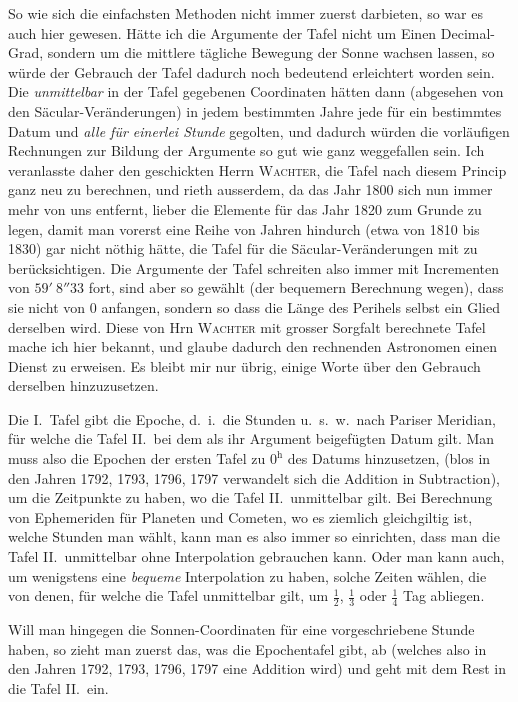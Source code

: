 So wie sich die einfachsten Methoden nicht immer zuerst darbieten, so war es auch hier gewesen. Hätte ich die Argumente der Tafel nicht um Einen Decimal-Grad, sondern um die mittlere tägliche Bewegung der Sonne wachsen lassen, so würde der Gebrauch der Tafel dadurch noch bedeutend erleichtert worden sein. Die \emph{unmittelbar} in der Tafel gegebenen Coordinaten hätten dann (abgesehen von den Säcular-Veränderungen) in jedem bestimmten Jahre jede für ein bestimmtes Datum und \emph{alle für einerlei Stunde} gegolten, und dadurch würden die vorläufigen Rechnungen zur Bildung der Argumente so gut wie ganz weggefallen sein. Ich veranlasste daher den geschickten Herrn \textsc{Wachter}, die Tafel nach diesem Princip ganz neu zu berechnen, und rieth ausserdem, da das Jahr 1800 sich nun immer mehr von uns entfernt, lieber die Elemente für das Jahr 1820 zum Grunde zu legen, damit man vorerst eine Reihe von Jahren hindurch (etwa von 1810 bis 1830) gar nicht nöthig hätte, die Tafel für die Säcular-Veränderungen mit zu berücksichtigen. Die Argumente der Tafel schreiten also immer mit Incrementen von $59'\ 8''33$ fort, sind aber so gewählt (der bequemern Berechnung wegen), dass sie nicht von 0 anfangen, sondern so dass die Länge des Perihels selbst ein Glied derselben wird. Diese von Hrn \textsc{Wachter} mit grosser Sorgfalt berechnete Tafel mache ich hier bekannt, und glaube dadurch den rechnenden Astronomen einen Dienst zu erweisen. Es bleibt mir nur übrig, einige Worte über den Gebrauch derselben hinzuzusetzen.
%

Die I.\ Tafel gibt die Epoche, d.\ i.\ die Stunden u.\ s.\ w.\ nach Pariser Meridian, für welche die Tafel II.\ bei dem als ihr Argument beigefügten Datum gilt. Man muss also die Epochen der ersten Tafel zu $0^{\mathrm h}$ des Datums hinzusetzen, (blos in den Jahren 1792, 1793, 1796, 1797 verwandelt sich die Addition in Subtraction), um die Zeitpunkte zu haben, wo die Tafel II.\ unmittelbar gilt. Bei Berechnung von Ephemeriden für Planeten und Cometen, wo es ziemlich gleichgiltig ist, welche Stunden man wählt, kann man es also immer so einrichten, dass man die Tafel II.\ unmittelbar ohne Interpolation gebrauchen kann. Oder man kann auch, um wenigstens eine \emph{bequeme} Interpolation zu haben, solche Zeiten wählen, die von denen, für welche die Tafel unmittelbar gilt, um $\frac12$, $\frac13$ oder $\frac14$ Tag abliegen.

Will man hingegen die Sonnen-Coordinaten für eine vorgeschriebene Stunde haben, so zieht man zuerst das, was die Epochentafel gibt, ab (welches also in den Jahren 1792, 1793, 1796, 1797 eine Addition wird) und geht mit dem Rest in die Tafel II.\ ein.

